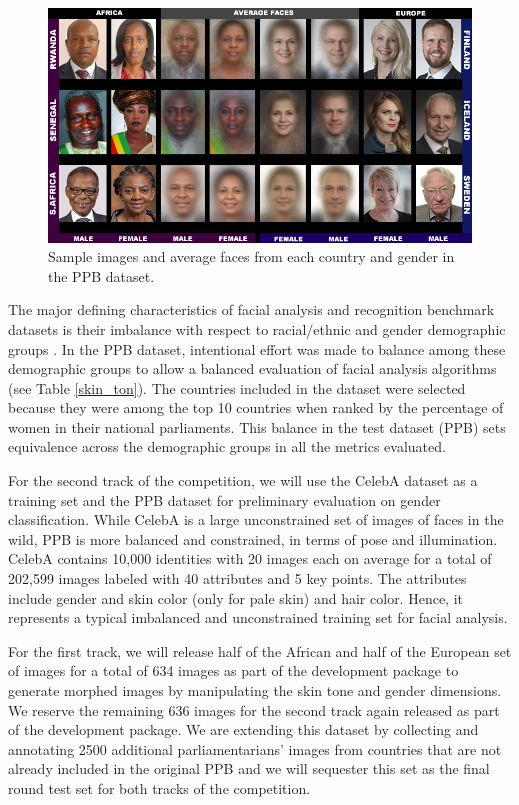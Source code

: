 \documentclass[11pt, oneside]{article}
\makeatletter
\let\@internalcite\cite
\def\cite{\def\citeauthoryear##1##2{##1, ##2}\@internalcite}
\makeatother
\begin{document}
\begin{figure}[t]
    \label{fig_ppb}
    \centering
    \includegraphics[width=140mm]{fig/ppb}
    \caption{Sample images and average faces from each country and gender in 
    	the PPB dataset.}
\end{figure}



The major defining characteristics of facial analysis and recognition benchmark 
datasets is their imbalance with respect to racial/ethnic and gender 
demographic groups \cite{phillips2011other, han2015demographic}. In the PPB 
dataset, intentional effort was made to balance among these demographic groups 
to allow a balanced evaluation of facial analysis algorithms (see Table 
\ref{skin_ton}). The countries included in the dataset were selected because 
they were among the top 10 countries when ranked by the percentage of women in their national parliaments. This balance in the test dataset 
(PPB) sets equivalence across the demographic groups in all the metrics 
evaluated.



For the second track of the competition, we will use the CelebA dataset 
\cite{liu2015deep} as a training set and the PPB dataset for preliminary 
evaluation on gender classification. While CelebA is a large unconstrained 
set of images of faces in the wild, PPB is more balanced and constrained, in terms 
of pose and illumination. CelebA contains 10,000 
identities with 20 images each on average for a total of 202,599 images labeled 
with 40 attributes and 5 key points. The attributes include gender and skin 
color (only for pale skin) and hair color. Hence, it represents a typical 
imbalanced and unconstrained training set for facial analysis.

For the first track, we will release half of the African and half of the 
European set of images for a total of 634 images as part of the development 
package to generate morphed images by manipulating the skin tone and gender 
dimensions. We reserve the remaining 636 images for the second track again 
released as part of the development package. We are extending this dataset by 
collecting and annotating 2500 additional parliamentarians' images from 
countries that are not already included in the original PPB and we will 
sequester this set as the final round test set for both tracks of the 
competition.
\end{document}
